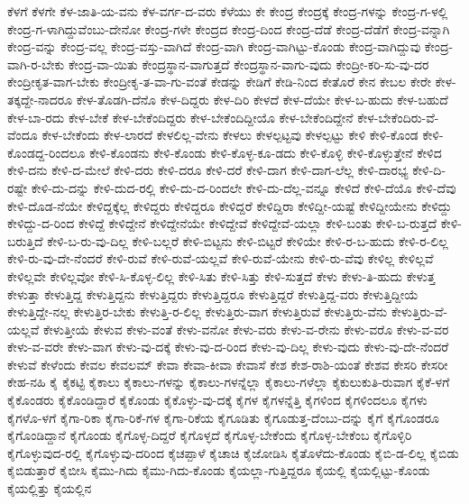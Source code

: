 ಕೆಳಗೆ
ಕೆಳಗೇ
ಕೆಳ-ಜಾತಿ-ಯ-ವನು
ಕೆಳ-ವರ್ಗ-ದ-ವರು
ಕೆಳೆಯು
ಕೇ
ಕೇಂದ್ರ
ಕೇಂದ್ರಕ್ಕೆ
ಕೇಂದ್ರ-ಗಳನ್ನು
ಕೇಂದ್ರ-ಗ-ಳಲ್ಲಿ
ಕೇಂದ್ರ-ಗ-ಳಾಗಿದ್ದುವೆಂಬು-ದೇನೋ
ಕೇಂದ್ರ-ಗಳೇ
ಕೇಂದ್ರದ
ಕೇಂದ್ರ-ದಿಂದ
ಕೇಂದ್ರ-ದೆಡೆ
ಕೇಂದ್ರ-ದೆಡೆಗೆ
ಕೇಂದ್ರ-ವನ್ನಾಗಿ
ಕೇಂದ್ರ-ವನ್ನು
ಕೇಂದ್ರ-ವಲ್ಲ
ಕೇಂದ್ರ-ವಸ್ತು-ವಾಗಿದೆ
ಕೇಂದ್ರ-ವಾಗಿ
ಕೇಂದ್ರ-ವಾಗಿಟ್ಟು-ಕೊಂಡು
ಕೇಂದ್ರ-ವಾಗಿದ್ದುವು
ಕೇಂದ್ರ-ವಾಗಿ-ರ-ಬೇಕು
ಕೇಂದ್ರ-ವಾ-ಯಿತು
ಕೇಂದ್ರಸ್ಥಾನ-ವಾಗುತ್ತದೆ
ಕೇಂದ್ರಸ್ಥಾನ-ವಾಗು-ವುದು
ಕೇಂದ್ರೀ-ಕರಿ-ಸು-ವು-ದರ
ಕೇಂದ್ರೀಕೃತ-ವಾಗ-ಬೇಕು
ಕೇಂದ್ರೀಕೃ-ತ-ವಾ-ಗು-ವಂತೆ
ಕೇಡನ್ನು
ಕೇಡಿಗೆ
ಕೇಡಿ-ನಿಂದ
ಕೇತೊರೆ
ಕೇನ
ಕೇಬಲ
ಕೇರೇ
ಕೇಳ-ತಕ್ಕದ್ದೇ-ನಾದರೂ
ಕೇಳ-ತೊಡಗಿ-ದೆನೊ
ಕೇಳ-ದಿದ್ದರು
ಕೇಳ-ದಿರಿ
ಕೇಳದೆ
ಕೇಳ-ದೆಯೇ
ಕೇಳ-ಬ-ಹುದು
ಕೇಳ-ಬಹುದೆ
ಕೇಳ-ಬಾ-ರದು
ಕೇಳ-ಬೇಕೆ
ಕೇಳ-ಬೇಕೆಂದಿದ್ದರು
ಕೇಳ-ಬೇಕೆಂದಿದ್ದೀಯೊ
ಕೇಳ-ಬೇಕೆಂದಿದ್ದೇನೆ
ಕೇಳ-ಬೇಕೆಂದಿರು-ವೆ-ವೆಂದೂ
ಕೇಳ-ಬೇಕೆಂದು
ಕೇಳ-ಲಾರದೆ
ಕೇಳಲಿಲ್ಲ-ವೇನು
ಕೇಳಲು
ಕೇಳಲ್ಪಟ್ಟವು
ಕೇಳಲ್ಪಟ್ಟು
ಕೇಳಿ
ಕೇಳಿ-ಕೊಂಡ
ಕೇಳಿ-ಕೊಂಡದ್ದ-ರಿಂದಲೂ
ಕೇಳಿ-ಕೊಂಡನು
ಕೇಳಿ-ಕೊಂಡು
ಕೇಳಿ-ಕೊಳ್ಳ-ಕೂ-ಡದು
ಕೇಳಿ-ಕೊಳ್ಳಿ
ಕೇಳಿ-ಕೊಳ್ಳುತ್ತೇನೆ
ಕೇಳಿದ
ಕೇಳಿ-ದನು
ಕೇಳಿ-ದ-ಮೇಲೆ
ಕೇಳಿ-ದರು
ಕೇಳಿ-ದರೂ
ಕೇಳಿ-ದರೆ
ಕೇಳಿ-ದಾಗ
ಕೇಳಿ-ದಾಗ-ಲೆಲ್ಲ
ಕೇಳಿ-ದಾರಭ್ಯ
ಕೇಳಿ-ದಿ-ರಷ್ಟೇ
ಕೇಳಿ-ದು-ದನ್ನು
ಕೇಳಿ-ದುದ-ರಲ್ಲಿ
ಕೇಳಿ-ದು-ದ-ರಿಂದಲೇ
ಕೇಳಿ-ದು-ದೆಲ್ಲ-ವನ್ನೂ
ಕೇಳಿದೆ
ಕೇಳಿ-ದೆಯೊ
ಕೇಳಿ-ದೆವು
ಕೇಳಿ-ದೊಡ-ನೆಯೇ
ಕೇಳಿದ್ದಕ್ಕೆಲ್ಲ
ಕೇಳಿದ್ದರು
ಕೇಳಿದ್ದರೂ
ಕೇಳಿದ್ದರೆ
ಕೇಳಿದ್ದಿರಾ
ಕೇಳಿದ್ದೀ-ಯಷ್ಟೆ
ಕೇಳಿದ್ದೀಯೇನು
ಕೇಳಿದ್ದು
ಕೇಳಿದ್ದು-ದ-ರಿಂದ
ಕೇಳಿದ್ದೆ
ಕೇಳಿದ್ದೇನೆ
ಕೇಳಿದ್ದೇನೆಯೇ
ಕೇಳಿದ್ದೇವೆ
ಕೇಳಿದ್ದೇವೆ-ಯಲ್ಲಾ
ಕೇಳಿ-ಬಂತು
ಕೇಳಿ-ಬ-ರುತ್ತದೆ
ಕೇಳಿ-ಬರುತ್ತಿದೆ
ಕೇಳಿ-ಬ-ರು-ವು-ದಿಲ್ಲ
ಕೇಳಿ-ಬಲ್ಲರೆ
ಕೇಳಿ-ಬಿಟ್ಟನು
ಕೇಳಿ-ಬಿಟ್ಟರೆ
ಕೇಳಿಯೇ
ಕೇಳಿ-ರ-ಬ-ಹುದು
ಕೇಳಿ-ರ-ಲಿಲ್ಲ
ಕೇಳಿ-ರು-ವು-ದೇ-ನೆಂದರೆ
ಕೇಳಿ-ರುವೆ
ಕೇಳಿ-ರುವೆ-ಯಲ್ಲವೆ
ಕೇಳಿ-ರುವೆ-ಯೇನು
ಕೇಳಿ-ರು-ವೆವು
ಕೇಳಿಲ್ಲ
ಕೇಳಿಲ್ಲವೆ
ಕೇಳಿಲ್ಲವೇ
ಕೇಳಿಲ್ಲವೋ
ಕೇಳಿ-ಸಿ-ಕೊಳ್ಳ-ಲಿಲ್ಲ
ಕೇಳಿ-ಸಿತು
ಕೇಳಿ-ಸಿತ್ತು
ಕೇಳಿ-ಸುತ್ತದೆ
ಕೇಳು
ಕೇಳು-ತಿ-ಹುದು
ಕೇಳುತ್ತ
ಕೇಳುತ್ತಾ
ಕೇಳುತ್ತಿದ್ದ
ಕೇಳುತ್ತಿದ್ದನು
ಕೇಳುತ್ತಿದ್ದರು
ಕೇಳುತ್ತಿದ್ದರೂ
ಕೇಳುತ್ತಿದ್ದರೆ
ಕೇಳುತ್ತಿದ್ದ-ವರು
ಕೇಳುತ್ತಿದ್ದೀಯೆ
ಕೇಳುತ್ತಿದ್ದೇ-ನಲ್ಲ
ಕೇಳುತ್ತಿರ-ಬೇಕು
ಕೇಳುತ್ತಿ-ರ-ಲಿಲ್ಲ
ಕೇಳುತ್ತಿರು-ವಾಗ
ಕೇಳುತ್ತಿರುವೆ
ಕೇಳುತ್ತಿರು-ವೆನು
ಕೇಳುತ್ತಿರು-ವೆ-ಯಲ್ಲವೆ
ಕೇಳುತ್ತೀಯೆ
ಕೇಳುವ
ಕೇಳು-ವಂತೆ
ಕೇಳು-ವನೋ
ಕೇಳು-ವರು
ಕೇಳು-ವ-ರೇನು
ಕೇಳು-ವರೊ
ಕೇಳು-ವ-ವರ
ಕೇಳು-ವ-ವರೇ
ಕೇಳು-ವಾಗ
ಕೇಳು-ವು-ದಕ್ಕೆ
ಕೇಳು-ವು-ದ-ರಿಂದ
ಕೇಳು-ವು-ದಿಲ್ಲ
ಕೇಳು-ವುದು
ಕೇಳು-ವು-ದೇ-ನೆಂದರೆ
ಕೇಳುವೆ
ಕೇಳೆಂದು
ಕೇವಲ
ಕೇವಲಮ್
ಕೇವಾ
ಕೇವಾ-ಕೀವಾ
ಕೇವಾಸೆ
ಕೇಶ
ಕೇಶ-ರಾಶಿ-ಯಂತೆ
ಕೇಶವ
ಕೇಸರಿ
ಕೇಸರೀ
ಕೇಹ-ನಹಿ
ಕೈ
ಕೈಕಟ್ಟಿ
ಕೈಕಾಲು
ಕೈಕಾಲು-ಗಳನ್ನು
ಕೈಕಾಲು-ಗಳನ್ನೆಲ್ಲಾ
ಕೈಕಾಲು-ಗಳೆಲ್ಲಾ
ಕೈಕುಲುಕುತಿ-ರುವಾಗ
ಕೈಕೆ-ಳಗೆ
ಕೈಕೊಂಡರು
ಕೈಕೊಂಡಿದ್ದಾರೆ
ಕೈಕೊಂಡು
ಕೈಕೊಳ್ಳು-ವು-ದಕ್ಕೆ
ಕೈಗಳ
ಕೈಗಳನ್ನೆತ್ತಿ
ಕೈಗಳಿಂದ
ಕೈಗಳಿಂದಲೂ
ಕೈಗಳು
ಕೈಗಳೊ-ಳಗೆ
ಕೈಗಾ-ರಿಕಾ
ಕೈಗಾ-ರಿಕೆ-ಗಳ
ಕೈಗಾ-ರಿಕೆಯ
ಕೈಗೂಡಿತು
ಕೈಗೂಡುತ್ತ-ದೆಂಬು-ದನ್ನು
ಕೈಗೆ
ಕೈಗೊಂಡರೂ
ಕೈಗೊಂಡಿದ್ದಾನೆ
ಕೈಗೊಂಡು
ಕೈಗೊಳ್ಳ-ದಿದ್ದರೆ
ಕೈಗೊಳ್ಳದೆ
ಕೈಗೊಳ್ಳ-ಬೇಕೆಂದು
ಕೈಗೊಳ್ಳ-ಬೇಕೆಂಬ
ಕೈಗೊಳ್ಳಿರಿ
ಕೈಗೊಳ್ಳುವುದ-ರಲ್ಲಿ
ಕೈಗೊಳ್ಳುವು-ದರಿಂದ
ಕೈಚಪ್ಪಾಳೆ
ಕೈಚಾಚಿ
ಕೈಜೋಡಿಸಿ
ಕೈತೊಳೆದು-ಕೊಂಡು
ಕೈಬಿ-ಡ-ಲಿಲ್ಲ
ಕೈಬಿಡು
ಕೈಬಿಡುತ್ತಾರೆ
ಕೈಬೀಸಿ
ಕೈಮು-ಗಿದು
ಕೈಮು-ಗಿದು-ಕೊಂಡು
ಕೈಯಲ್ಲಾ-ಗುತ್ತಿದ್ದರೂ
ಕೈಯಲ್ಲಿ
ಕೈಯಲ್ಲಿಟ್ಟು-ಕೊಂಡು
ಕೈಯಲ್ಲಿತ್ತು
ಕೈಯಲ್ಲಿನ
